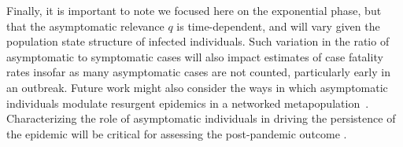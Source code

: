 Finally, it is important to note we focused here on the exponential phase, but that the asymptomatic relevance $q$ is time-dependent, and will vary given the population state structure of infected individuals. Such variation in the ratio of asymptomatic to symptomatic cases will also impact estimates of case fatality rates insofar as many asymptomatic cases are not counted, particularly early in an outbreak.
Future work might also consider the ways in which asymptomatic individuals modulate resurgent epidemics in a networked metapopulation~\citep{watts_pnas2005}.
Characterizing the role of asymptomatic individuals in driving the persistence of the epidemic will be critical for assessing the post-pandemic outcome \citep{lipsitch_preprint}.



